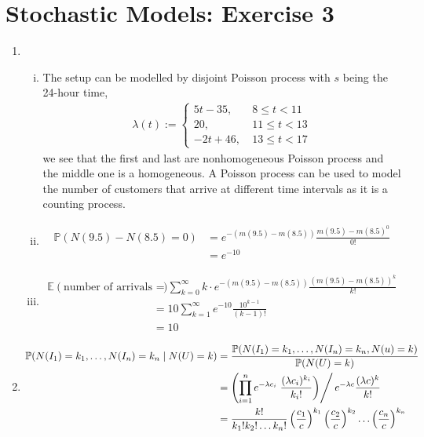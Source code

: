 \documentclass[a4paper,10pt]{article}
\theoremstyle{definition}
\begin{document}
\section*{Stochastic Models: Exercise 3}

\begin{enumerate}
\item
\begin{enumerate}[(i)]
\item 
The setup can be modelled by disjoint Poisson process with $s$ being the 24-hour time,
\begin{align*}
\lambda(t):=\begin{cases}
5t-35, &~8\leq t < 11\\
20, &~11\leq t < 13\\
-2t+46, &~13\leq t < 17
\end{cases}
\end{align*}
we see that the first and last are nonhomogeneous Poisson process and the middle one is a homogeneous. A Poisson process can be used to model the number of customers that arrive at different time intervals as it is a counting process.

\item 
\begin{align*}
\mathbb{P}(N(9.5)-N(8.5)=0)&=e^{-(m(9.5)-m(8.5))}\frac{m(9.5)-m(8.5)^0}{0!}\\
&=e^{-10}
\end{align*}
\item 
\begin{align*}
\mathbb{E}(\text{number of arrivals from 8:30AM-9:30AM})&=\sum_{k=0}^{\infty}k\cdot e^{-(m(9.5)-m(8.5))}\frac{(m(9.5)-m(8.5))^k}{k!}\\
&=10\sum_{k=1}^{\infty} e^{-10}\frac{10^{k-1}}{(k-1)!}\\
&=10
\end{align*}
\end{enumerate}
\item 
\begin{align*}
\mathbb{P}(N(I_1)=k_1,\ldots,N(I_n)=k_n\mid N(U)=k)&=\frac{\mathbb{P}(N(I_1)=k_1,\ldots,N(I_n)=k_n,N(u)=k)}{\mathbb{P}(N(U)=k)}\\
&=\left(\prod_{i=1}^{n}e^{-\lambda c_i}\left.\frac{(\lambda c_i)^{k_i}}{k_i!}\right)\right/ e^{-\lambda c}\frac{(\lambda c)^k}{k!}\\
&=\frac{k!}{k_1!k_2!\ldots k_n!}\left(\frac{c_1}{c}\right)^{k_1}\left(\frac{c_2}{c}\right)^{k_2}\ldots\left(\frac{c_n}{c}\right)^{k_n}
\end{align*}


\end{enumerate}
\end{document}
